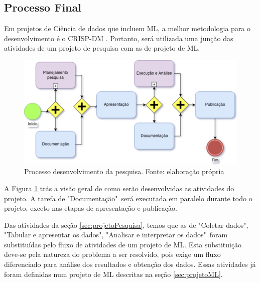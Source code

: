 \subsection{Processo Final}

Em projetos de Ciência de dados que incluem ML, a melhor metodologia para o desenvolvimento é o CRISP-DM \cite{CROWSTON2017}.
Portanto, será utilizada uma junção das atividades de um projeto de pesquisa com as de projeto de ML.

\begin{figure}[h]
	\centering
    \includegraphics[keepaspectratio=true,scale=0.5]{figuras/processoPrincipal}
	\caption[Processo desenvolvimento da pesquisa]{Processo desenvolvimento da pesquisa. Fonte: elaboração própria}
	\label{fig:processoPrincipal}
\end{figure}

A Figura \ref{fig:processoPrincipal} trás a visão geral de como serão desenvolvidas as atividades do projeto. A tarefa de "Documentação"\ será executada em paralelo durante todo o projeto, exceto nas etapas de apresentação e publicação.

Das atividades da seção \ref{sec:projetoPesquisa}, temos que as de "Coletar dados", "Tabular e apresentar os dados", "Analisar e interpretar os dados"\ foram substituídas pelo fluxo de atividades de um projeto de ML. Esta substituição deve-se pela natureza do problema a ser resolvido, pois exige um fluxo diferenciado para análise dos resultados e obtenção dos dados. Essas atividades já foram definidas num projeto de ML descritas na seção \ref{sec:projetoML}.

